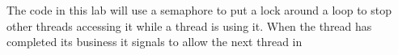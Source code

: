 The code in this lab will use a semaphore to put a lock around a loop to stop other threads accessing it while a thread is using it. When the thread has completed it\textquotesingle{}s business it signals to allow the next thread in 
